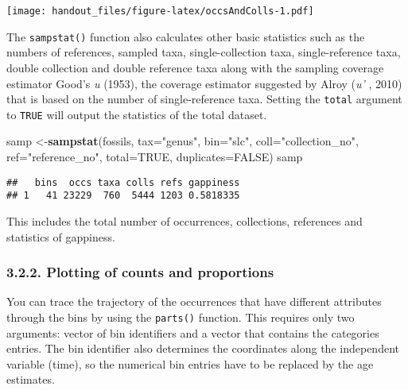 \documentclass[]{article}
\newenvironment{Shaded}{\begin{snugshade}}{\end{snugshade}}
\newcommand{\KeywordTok}[1]{\textcolor[rgb]{0.13,0.29,0.53}{\textbf{{#1}}}}
\newcommand{\DataTypeTok}[1]{\textcolor[rgb]{0.13,0.29,0.53}{{#1}}}
\newcommand{\DecValTok}[1]{\textcolor[rgb]{0.00,0.00,0.81}{{#1}}}
\newcommand{\StringTok}[1]{\textcolor[rgb]{0.31,0.60,0.02}{{#1}}}
\newcommand{\CommentTok}[1]{\textcolor[rgb]{0.56,0.35,0.01}{\textit{{#1}}}}
\newcommand{\OtherTok}[1]{\textcolor[rgb]{0.56,0.35,0.01}{{#1}}}
\newcommand{\NormalTok}[1]{{#1}}
\begin{document}
\texttt{[image: handout\_files/figure-latex/occsAndColls-1.pdf]}

The \texttt{sampstat()} function also calculates other basic statistics
such as the numbers of references, sampled taxa, single-collection taxa,
single-reference taxa, double collection and double reference taxa along
with the sampling coverage estimator Good's \emph{u} (1953), the
coverage estimator suggested by Alroy (\emph{u' }, 2010) that is based
on the number of single-reference taxa. Setting the \texttt{total}
argument to \texttt{TRUE} will output the statistics of the total
dataset.

\begin{Shaded}
\begin{Highlighting}[]
\NormalTok{samp <-}\KeywordTok{sampstat}\NormalTok{(fossils, }\DataTypeTok{tax=}\StringTok{"genus"}\NormalTok{, }\DataTypeTok{bin=}\StringTok{"slc"}\NormalTok{, }
  \DataTypeTok{coll=}\StringTok{"collection_no"}\NormalTok{, }\DataTypeTok{ref=}\StringTok{"reference_no"}\NormalTok{, }\DataTypeTok{total=}\OtherTok{TRUE}\NormalTok{, }\DataTypeTok{duplicates=}\OtherTok{FALSE}\NormalTok{)}
\NormalTok{samp}
\end{Highlighting}
\end{Shaded}

\begin{verbatim}
##   bins  occs taxa colls refs gappiness
## 1   41 23229  760  5444 1203 0.5818335
\end{verbatim}

This includes the total number of occurrences, collections, references
and statistics of gappiness.

\subsubsection{3.2.2. Plotting of counts and
proportions}\label{plotting-of-counts-and-proportions}

You can trace the trajectory of the occurrences that have different
attributes through the bins by using the \texttt{parts()} function. This
requires only two arguments: vector of bin identifiers and a vector that
contains the categories entries. The bin identifier also determines the
coordinates along the independent variable (time), so the numerical bin
entries have to be replaced by the age estimates.

\begin{Shaded}
\end{Shaded}
\end{document}
